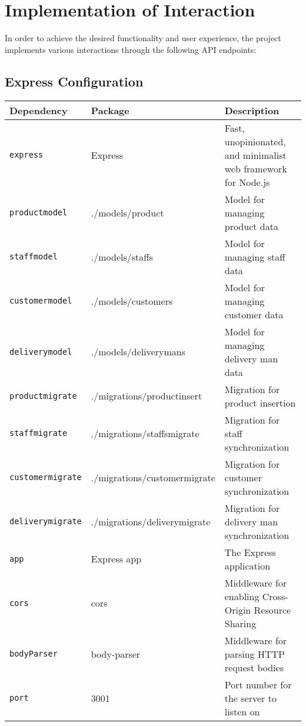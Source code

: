 \section{Implementation of Interaction}
In order to achieve the desired functionality and user experience, the project implements various interactions through the following API endpoints:

\subsection*{Express Configuration}    
\begin{tabular}{|l|l|p{8cm}|}
\hline
\textbf{Dependency} & \textbf{Package} & \textbf{Description} \\ \hline
\texttt{express} & Express & Fast, unopinionated, and minimalist web framework for Node.js \\ \hline
\texttt{productmodel} & ./models/product & Model for managing product data \\ \hline
\texttt{staffmodel} & ./models/staffs & Model for managing staff data \\ \hline
\texttt{customermodel} & ./models/customers & Model for managing customer data \\ \hline
\texttt{deliverymodel} & ./models/deliverymans & Model for managing delivery man data \\ \hline
\texttt{productmigrate} & ./migrations/productinsert & Migration for product insertion \\ \hline
\texttt{staffmigrate} & ./migrations/staffsmigrate & Migration for staff synchronization \\ \hline
\texttt{customermigrate} & ./migrations/customermigrate & Migration for customer synchronization \\ \hline
\texttt{deliverymigrate} & ./migrations/deliverymigrate & Migration for delivery man synchronization \\ \hline
\texttt{app} & Express app & The Express application \\ \hline
\texttt{cors} & cors & Middleware for enabling Cross-Origin Resource Sharing \\ \hline
\texttt{bodyParser} & body-parser & Middleware for parsing HTTP request bodies \\ \hline
\texttt{port} & 3001 & Port number for the server to listen on \\ \hline
\end{tabular}

